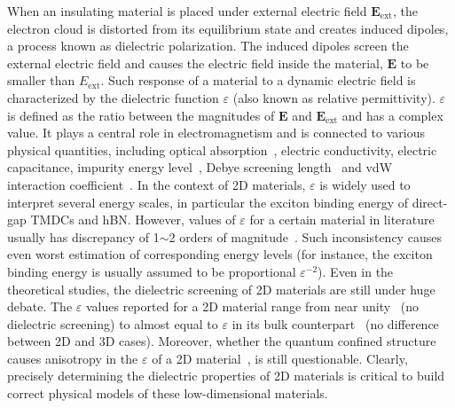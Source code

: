 When an insulating material is placed under external electric field
$\mathbf{E}_{\mathrm{ext}}$, the electron cloud is distorted from its
equilibrium state and creates induced dipoles, a process known as
dielectric polarization. The induced dipoles screen the external
electric field and causes the electric field inside the material,
$\mathbf{E}$ to be smaller than $E_{\mathrm{ext}}$.
%
Such response of a material to a dynamic electric field is
characterized by the dielectric function $\varepsilon$ (also known as
relative permittivity).
%
$\varepsilon$ is defined as the ratio between the magnitudes of
$\mathbf{E}$ and $\mathbf{E}_{\mathrm{ext}}$ and has a complex value.
%
It plays a central role in electromagnetism and is connected to
various physical quantities, including optical
absorption~\cite{Dressel_2001_electrodynamics}, electric conductivity,
electric capacitance, impurity energy level~\cite{Ihn_2009_book},
Debye screening length~\cite{Israelachvili_2011_book} and vdW
interaction coefficient~\parencite{parsegian_van_2010}.
%
In the context of 2D materials, $\varepsilon$ is widely used to
interpret several energy scales, in particular the exciton binding
energy of direct-gap TMDCs and hBN.
%
However, values of $\varepsilon$ for a certain material in literature
usually has discrepancy of 1$\sim{}$2 orders of magnitude~\cite{Li_2016}.
%
Such inconsistency causes even worst estimation of corresponding
energy levels (for instance, the exciton binding energy is usually
assumed to be proportional $\varepsilon^{-2}$).
%
Even in the theoretical studies, the dielectric screening of 2D
materials are still under huge debate.  The $\varepsilon$ values
reported for a 2D material range from near
unity~\cite{Olsen_2016_hydrogen} (\ie no dielectric screening) to
almost equal to $\varepsilon$ in its bulk
counterpart~\cite{Laturia_2018} (\ie no difference between 2D and 3D
cases).
%
Moreover, whether the quantum confined structure causes anisotropy in
the $\varepsilon$ of a 2D material~\cite{Sohier_2016}, is still
questionable.
%
Clearly, precisely determining the dielectric properties of 2D
materials is critical to build correct physical models of these
low-dimensional materials.

